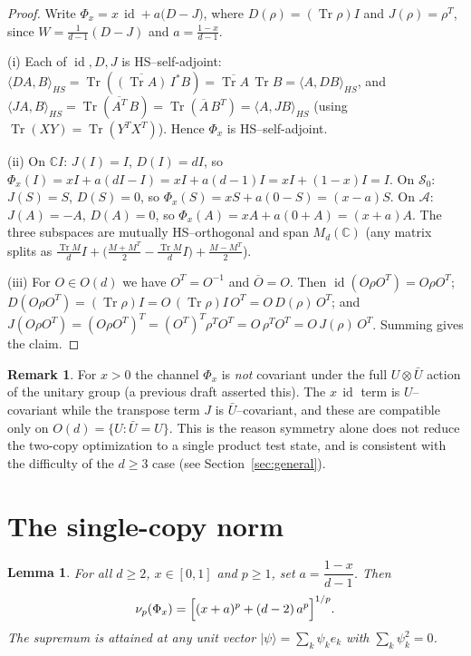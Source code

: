 \documentclass{amsart}
\newtheorem{lemma}{Lemma}
\theoremstyle{definition}
\newtheorem{remark}{Remark}
\DeclareMathOperator{\Tr}{Tr}
\DeclareMathOperator{\id}{id}
\begin{document}
\begin{proof}
Write $\Phi_x=x\,\id+a\bigl(D-J\bigr)$, where $D(\rho)=(\Tr\rho)I$ and
$J(\rho)=\rho^{T}$, since $W=\tfrac1{d-1}(D-J)$ and $a=\tfrac{1-x}{d-1}$.

(i) Each of $\id,D,J$ is HS--self-adjoint: $\langle D A,B\rangle_{HS}
=\Tr(\overline{(\Tr A)}\,I^{*}B)=\overline{\Tr A}\,\Tr B
=\langle A,DB\rangle_{HS}$, and $\langle JA,B\rangle_{HS}
=\Tr(\overline{A^{T}}\,B)=\Tr(\overline{A}\,B^{T})=\langle A,JB\rangle_{HS}$
(using $\Tr(XY)=\Tr(Y^{T}X^{T})$). Hence $\Phi_x$ is HS--self-adjoint.

(ii) On $\mathbb C I$: $J(I)=I$, $D(I)=dI$, so
$\Phi_x(I)=xI+a(dI-I)=xI+a(d-1)I=xI+(1-x)I=I$. On $\mathcal S_0$:
$J(S)=S$, $D(S)=0$, so $\Phi_x(S)=xS+a(0-S)=(x-a)S$. On $\mathcal A$:
$J(A)=-A$, $D(A)=0$, so $\Phi_x(A)=xA+a(0+A)=(x+a)A$. The three subspaces are
mutually HS--orthogonal and span $M_d(\mathbb C)$ (any matrix splits as
$\tfrac{\Tr M}{d}I+\big(\tfrac{M+M^{T}}{2}-\tfrac{\Tr M}{d}I\big)
+\tfrac{M-M^{T}}{2}$).

(iii) For $O\in O(d)$ we have $O^{T}=O^{-1}$ and $\overline O=O$. Then
$\id(O\rho O^{T})=O\rho O^{T}$; $D(O\rho O^{T})=(\Tr\rho)I=O\,(\Tr\rho)I\,O^{T}
=O\,D(\rho)\,O^{T}$; and $J(O\rho O^{T})=(O\rho O^{T})^{T}
=(O^{T})^{T}\rho^{T}O^{T}=O\,\rho^{T}O^{T}=O\,J(\rho)\,O^{T}$. Summing gives
the claim.
\end{proof}

\begin{remark}\label{rem:notUcov}
For $x>0$ the channel $\Phi_x$ is \emph{not} covariant under the full
$U\otimes\bar U$ action of the unitary group (a previous draft asserted this).
The $x\,\id$ term is $U$--covariant while the transpose term $J$ is
$\bar U$--covariant, and these are compatible only on $O(d)=\{U:\bar U=U\}$.
This is the reason symmetry alone does not reduce the two-copy optimization to a
single product test state, and is consistent with the difficulty of the
$d\ge3$ case (see Section~\ref{sec:general}).
\end{remark}

\section{The single-copy norm}
\label{sec:single}

\begin{lemma}\label{lem:single}
For all $d\ge2$, $x\in[0,1]$ and $p\ge1$, set $a=\dfrac{1-x}{d-1}$. Then
\begin{equation}\label{eq:nuformula}
\nu_p(\Phi_x)=\Bigl[(x+a)^{p}+(d-2)\,a^{p}\Bigr]^{1/p}.
\end{equation}
The supremum is attained at any unit vector $|\psi\rangle=\sum_k\psi_k e_k$ with
$\sum_k\psi_k^{2}=0$.
\end{lemma}
\end{document}
